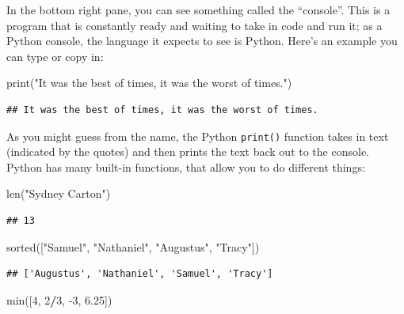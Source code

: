 \documentclass[]{Nemilov}
\newenvironment{Shaded}{\begin{snugshade}}{\end{snugshade}}
\newcommand{\BuiltInTok}[1]{#1}
\newcommand{\DecValTok}[1]{\textcolor[rgb]{0.00,0.00,0.81}{#1}}
\newcommand{\FloatTok}[1]{\textcolor[rgb]{0.00,0.00,0.81}{#1}}
\newcommand{\NormalTok}[1]{#1}
\newcommand{\OperatorTok}[1]{\textcolor[rgb]{0.81,0.36,0.00}{\textbf{#1}}}
\newcommand{\StringTok}[1]{\textcolor[rgb]{0.31,0.60,0.02}{#1}}
\begin{document}
In the bottom right pane, you can see something called the ``console''. This
is a program that is constantly ready and waiting to take in code and run it; as
a Python console, the language it expects to see is Python. Here's
an example you can type or copy in:

\begin{Shaded}
\begin{Highlighting}[]
\BuiltInTok{print}\NormalTok{(}\StringTok{"It was the best of times, it was the worst of times."}\NormalTok{)}
\end{Highlighting}
\end{Shaded}

\begin{verbatim}
## It was the best of times, it was the worst of times.
\end{verbatim}

As you might guess from the name, the Python \texttt{print()} function
takes in text (indicated by the quotes) and then prints the text back out to the console.
Python has many built-in functions, that allow you to do different things:

\begin{Shaded}
\begin{Highlighting}[]
\BuiltInTok{len}\NormalTok{(}\StringTok{"Sydney Carton"}\NormalTok{)}
\end{Highlighting}
\end{Shaded}

\begin{verbatim}
## 13
\end{verbatim}

\begin{Shaded}
\begin{Highlighting}[]
\BuiltInTok{sorted}\NormalTok{([}\StringTok{"Samuel"}\NormalTok{, }\StringTok{"Nathaniel"}\NormalTok{, }\StringTok{"Augustus"}\NormalTok{, }\StringTok{"Tracy"}\NormalTok{])}
\end{Highlighting}
\end{Shaded}

\begin{verbatim}
## ['Augustus', 'Nathaniel', 'Samuel', 'Tracy']
\end{verbatim}

\begin{Shaded}
\begin{Highlighting}[]
\BuiltInTok{min}\NormalTok{([}\DecValTok{4}\NormalTok{, }\DecValTok{2}\OperatorTok{/}\DecValTok{3}\NormalTok{, }\DecValTok{-3}\NormalTok{, }\FloatTok{6.25}\NormalTok{])}
\end{Highlighting}
\end{Shaded}
\end{document}
